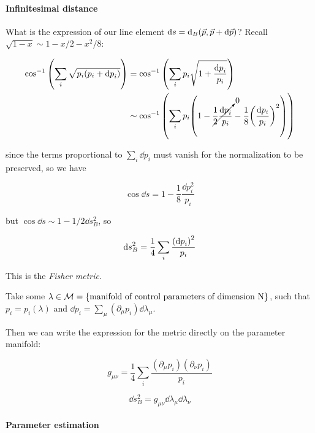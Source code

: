 \documentclass[main.tex]{subfiles}
\begin{document}
\paragraph{Infinitesimal distance}

What is the expression of our line element  \(\dd{s} =  \dd _{B} \qty(\vec{p} , \vec{p} + \dd{\vec{p}}) \)? Recall \(\sqrt{1-x} \sim 1 - x/2 -x^2/8\):

\begin{align}
  \cos ^{-1} \qty(\sum_i \sqrt{p_i(p_i + \dd{p}_i)})
  &= \cos ^{-1} \qty(\sum_i p_i \sqrt{1 + \frac{\dd{p}_i }{p_i}})  \\
  &\sim \cos ^{-1} \qty(\sum_i p_i \qty(1 - \cancelto{0}{\frac{1}{2} \frac{\dd{p}_i}{p_i}}
  - \frac{1}{8} \qty(\frac{\dd{p_i}}{p_i})^{2} ))
\end{align}

since the terms proportional to \( \sum_i \dd{p}_i \) must vanish for the normalization to be preserved, so we have

\begin{equation}
  \cos \dd{s} = 1 - \frac{1}{8}\frac{\dd{p}_i ^{2} }{p_i}
\end{equation}

but \( \cos \dd{s} \sim 1 - 1/2 \dd{s}^{2} _{B}  \), so

\begin{equation} \label{eq:fisher-metric}
  \dd{s}^{2}_{B}  = \frac{1}{4} \sum_i  \frac{\qty(\dd{p}_i)^{2} }{p_i}
\end{equation}

This is the \emph{Fisher metric}.

Take some \( \lambda \in \mathcal{M} = \qty{\text{manifold of control parameters of dimension N}} \), such that \( p_i = p_i(\lambda) \) and  \( \dd{p}_i = \sum_\mu (\partial_\mu p_i) \dd{\lambda_\mu} \).

Then we can write the expression for the metric directly on the parameter manifold:

\begin{equation}
  g _{\mu \nu} = \frac{1}{4} \sum_i \frac{(\partial_\mu p_i)(\partial_\nu p_i)}{p_i}
\end{equation}

\begin{equation}
  \dd{s}_B ^2 = g _{\mu \nu} \dd{\lambda}_\mu \dd{\lambda}_\nu
\end{equation}

\paragraph{Parameter estimation}
\end{document}
